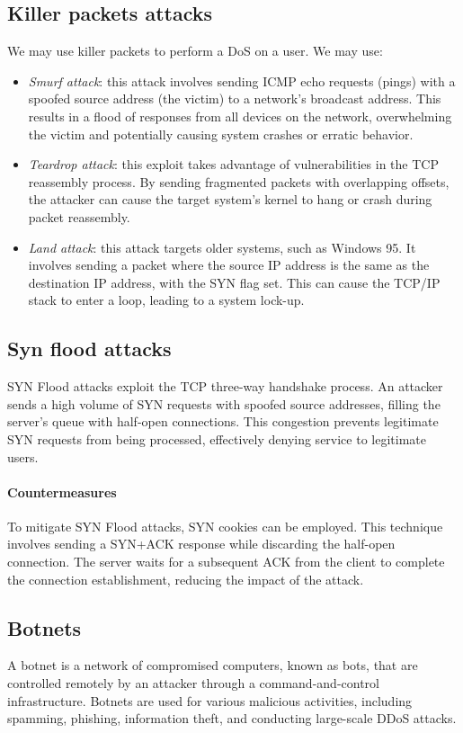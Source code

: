 \subsection{Killer packets attacks}
We may use killer packets to perform a DoS on a user. 
We may use: 
\begin{itemize}
    \item \textit{Smurf attack}: this attack involves sending ICMP echo requests (pings) with a spoofed source address (the victim) to a network's broadcast address. 
        This results in a flood of responses from all devices on the network, overwhelming the victim and potentially causing system crashes or erratic behavior.
    \item \textit{Teardrop attack}: this exploit takes advantage of vulnerabilities in the TCP reassembly process.
        By sending fragmented packets with overlapping offsets, the attacker can cause the target system's kernel to hang or crash during packet reassembly.
    \item \textit{Land attack}: this attack targets older systems, such as Windows 95. 
        It involves sending a packet where the source IP address is the same as the destination IP address, with the SYN flag set. 
        This can cause the TCP/IP stack to enter a loop, leading to a system lock-up.
\end{itemize}

\subsection{Syn flood attacks}
SYN Flood attacks exploit the TCP three-way handshake process. 
An attacker sends a high volume of SYN requests with spoofed source addresses, filling the server's queue with half-open connections. 
This congestion prevents legitimate SYN requests from being processed, effectively denying service to legitimate users.

\paragraph*{Countermeasures}
To mitigate SYN Flood attacks, SYN cookies can be employed. 
This technique involves sending a SYN+ACK response while discarding the half-open connection. 
The server waits for a subsequent ACK from the client to complete the connection establishment, reducing the impact of the attack.

\subsection{Botnets}
A botnet is a network of compromised computers, known as bots, that are controlled remotely by an attacker through a command-and-control infrastructure. 
Botnets are used for various malicious activities, including spamming, phishing, information theft, and conducting large-scale DDoS attacks.

